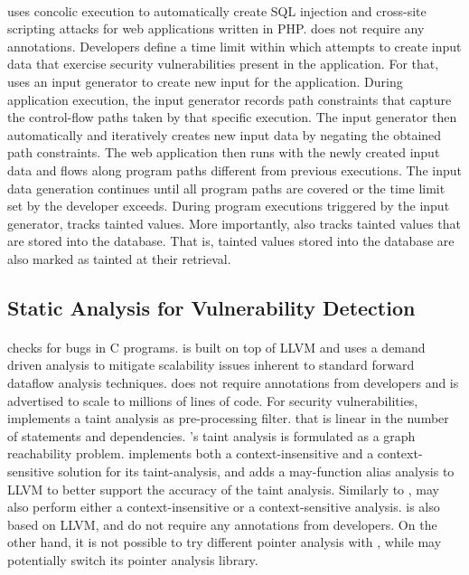 \paragraph{\ardilla}\cite{Kiezun:2009:Ardilla} uses concolic
execution to automatically create SQL injection and
cross-site scripting attacks for web applications written in PHP.
\ardilla does not require any annotations. Developers
define a time limit within which \ardilla attempts to
create input data that exercise security vulnerabilities
present in the application. For that, \ardilla uses an input
generator to create new input for the application.
During application execution, the input generator records path
constraints that capture the control-flow paths taken by
that specific execution. The input generator then automatically
and iteratively creates new input data by negating the
obtained path constraints.
The web application then runs with the newly created
input data and flows along program paths different from
previous executions. The input data generation continues
until all program paths are covered or the time limit set
by the developer exceeds.
During program executions triggered by the input generator,
\ardilla tracks tainted values. More importantly, \ardilla
also tracks tainted values that are stored into the database.
That is, tainted values stored into the database are also
marked as tainted at their retrieval.

\subsection{Static Analysis for Vulnerability Detection}

\paragraph{\parfait}\cite{Parfait:2008} checks for bugs
in C programs. \parfait is built on top of LLVM and uses
a demand driven analysis to mitigate scalability issues
inherent to standard forward dataflow analysis techniques.	
\parfait does not require annotations from developers and
is advertised to scale to millions of lines of code. 
For security vulnerabilities, \parfait implements a taint
analysis\cite{Scholz:2008:UDA} as pre-processing filter.
that is linear in the number of statements and dependencies.
\parfait's taint analysis is formulated as a graph reachability
problem. \parfait implements both a context-insensitive and
a context-sensitive solution for its taint-analysis, and 
adds a may-function alias analysis to LLVM to better support
the accuracy of the taint analysis.
Similarly to \parfait, \waint may also perform either a
context-insensitive or a context-sensitive analysis. \waint
is also based on LLVM, and do not require any annotations
from developers.
On the other hand, it is not possible to try different pointer
analysis with \parfait, while \waint may potentially switch
its pointer analysis library.

